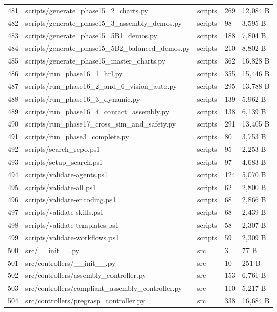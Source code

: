 \documentclass[11pt,a4paper,oneside]{book}
\begin{document}
\begin{longtable}{l l l l l}
481 & scripts/generate\_phase15\_2\_charts.py & scripts & 269 & 12,084 B \\
482 & scripts/generate\_phase15\_3\_assembly\_demos.py & scripts & 98 & 3,595 B \\
483 & scripts/generate\_phase15\_5B1\_demos.py & scripts & 188 & 7,804 B \\
484 & scripts/generate\_phase15\_5B2\_balanced\_demos.py & scripts & 210 & 8,802 B \\
485 & scripts/generate\_phase15\_master\_charts.py & scripts & 362 & 16,828 B \\
486 & scripts/run\_phase16\_1\_hrl.py & scripts & 355 & 15,446 B \\
487 & scripts/run\_phase16\_2\_and\_6\_vision\_auto.py & scripts & 295 & 13,788 B \\
488 & scripts/run\_phase16\_3\_dynamic.py & scripts & 139 & 5,962 B \\
489 & scripts/run\_phase16\_4\_contact\_assembly.py & scripts & 138 & 6,139 B \\
490 & scripts/run\_phase17\_cross\_sim\_and\_safety.py & scripts & 291 & 13,405 B \\
491 & scripts/run\_phase3\_complete.py & scripts & 80 & 3,753 B \\
492 & scripts/search\_repo.ps1 & scripts & 95 & 2,253 B \\
493 & scripts/setup\_search.ps1 & scripts & 97 & 4,683 B \\
494 & scripts/validate-agents.ps1 & scripts & 124 & 5,070 B \\
495 & scripts/validate-all.ps1 & scripts & 62 & 2,800 B \\
496 & scripts/validate-encoding.ps1 & scripts & 68 & 2,866 B \\
497 & scripts/validate-skills.ps1 & scripts & 68 & 2,439 B \\
498 & scripts/validate-templates.ps1 & scripts & 58 & 2,307 B \\
499 & scripts/validate-workflows.ps1 & scripts & 59 & 2,309 B \\
500 & src/\_\_init\_\_.py & src & 3 & 77 B \\
501 & src/controllers/\_\_init\_\_.py & src & 10 & 251 B \\
502 & src/controllers/assembly\_controller.py & src & 153 & 6,761 B \\
503 & src/controllers/compliant\_assembly\_controller.py & src & 110 & 5,217 B \\
504 & src/controllers/pregrasp\_controller.py & src & 338 & 16,684 B \\

\end{longtable}
\end{document}
